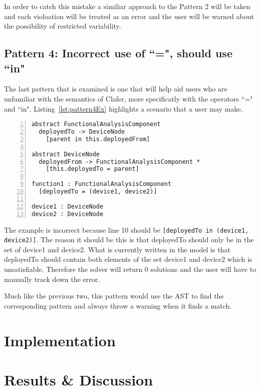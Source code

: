\documentclass[10pt,oneside]{IEEEtran}
\begin{document}
In order to catch this mistake a similiar approach to the Pattern 2 will be taken and each violoation will be treated as an error and the user will be warned about the possibility of restricted variability.

\subsection{Pattern 4: Incorrect use of ``=", should use ``in"}
The last pattern that is examined is one that will help aid users who are unfamiliar with the semantics of Clafer, more specificatly with the operators ``=" and ``in". Listing~\ref{lst:pattern4Ex} highlights a scenario that a user may make.
\begin{lstlisting}[label={lst:pattern4Ex},caption={Example of Pattern 4},numbers=left]
abstract FunctionalAnalysisComponent
  deployedTo -> DeviceNode
    [parent in this.deployedFrom]

abstract DeviceNode
  deployedFrom -> FunctionalAnalysisComponent *
    [this.deployedTo = parent]

function1 : FunctionalAnalysisComponent
  [deployedTo = (device1, device2)]

device1 : DeviceNode
device2 : DeviceNode
\end{lstlisting}

The example is incorrect because line 10 should be \lstinline$[deployedTo in (device1, device2)]$. The reason it should be this is that deployedTo should only be in the set of device1 and device2. What is currently written in the model is that deployedTo should contain both elements of the set device1 and device2 which is unsatisfiable. Therefore the solver will return 0 solutions and the user will have to manually track down the error.

Much like the previous two, this pattern would use the AST to find the corresponding pattern and always throw a warning when it finds a match.

\section{Implementation}
\label{sec:implementation}

\section{Results \& Discussion}

\medskip

\printbibliography
\end{document}
